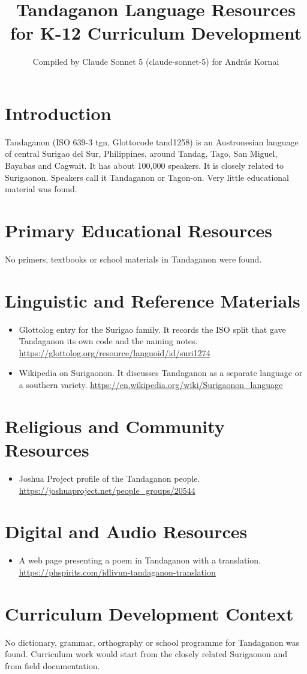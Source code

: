 \documentclass[12pt]{article}
\title{Tandaganon Language Resources for K-12 Curriculum Development}
\author{Compiled by Claude Sonnet 5 (claude-sonnet-5) for Andr\'as Kornai}
\date{}
\begin{document}
\maketitle
\section{Introduction}
Tandaganon (ISO 639-3 tgn, Glottocode tand1258) is an Austronesian language of central Surigao del Sur, Philippines, around Tandag, Tago, San Miguel, Bayabas and Cagwait. It has about 100,000 speakers. It is closely related to Surigaonon. Speakers call it Tandaganon or Tagon-on. Very little educational material was found.
\section{Primary Educational Resources}
No primers, textbooks or school materials in Tandaganon were found.
\section{Linguistic and Reference Materials}
\begin{itemize}
\item Glottolog entry for the Surigao family. It records the ISO split that gave Tandaganon its own code and the naming notes. \url{https://glottolog.org/resource/languoid/id/suri1274}
\item Wikipedia on Surigaonon. It discusses Tandaganon as a separate language or a southern variety. \url{https://en.wikipedia.org/wiki/Surigaonon_language}
\end{itemize}
\section{Religious and Community Resources}
\begin{itemize}
\item Joshua Project profile of the Tandaganon people. \url{https://joshuaproject.net/people_groups/20544}
\end{itemize}
\section{Digital and Audio Resources}
\begin{itemize}
\item A web page presenting a poem in Tandaganon with a translation. \url{https://phspirits.com/idlivun-tandaganon-translation}
\end{itemize}
\section{Curriculum Development Context}
No dictionary, grammar, orthography or school programme for Tandaganon was found. Curriculum work would start from the closely related Surigaonon and from field documentation.
\end{document}
